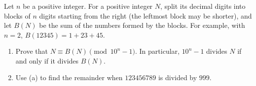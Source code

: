 Let $n$ be a positive integer. For a positive integer $N$, split its decimal digits into blocks of $n$ digits starting from the right (the leftmost block may be shorter), and let $B(N)$ be the sum of the numbers formed by the blocks. For example, with $n=2$, $B(12345)=1+23+45$.
\begin{enumerate}
\item[(a)] Prove that $N\equiv B(N)\pmod{10^n-1}$. In particular, $10^n-1$ divides $N$ if and only if it divides $B(N)$.
\item[(b)] Use (a) to find the remainder when $123456789$ is divided by $999$.
\end{enumerate}
